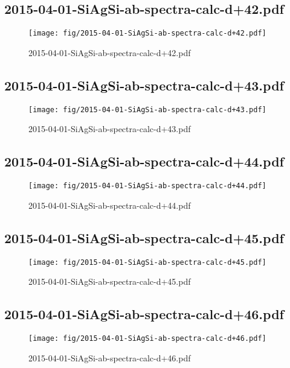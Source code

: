 \documentclass[fullscreen=true]{beamer}
\begin{document}
\subsection{2015-04-01-SiAgSi-ab-spectra-calc-d+42.pdf}
\begin{frame}
  \begin{figure}
    \texttt{[image: fig/2015-04-01-SiAgSi-ab-spectra-calc-d+42.pdf]}%
    \caption{2015-04-01-SiAgSi-ab-spectra-calc-d+42.pdf}
  \end{figure}
\end{frame}

\subsection{2015-04-01-SiAgSi-ab-spectra-calc-d+43.pdf}
\begin{frame}
  \begin{figure}
    \texttt{[image: fig/2015-04-01-SiAgSi-ab-spectra-calc-d+43.pdf]}%
    \caption{2015-04-01-SiAgSi-ab-spectra-calc-d+43.pdf}
  \end{figure}
\end{frame}

\subsection{2015-04-01-SiAgSi-ab-spectra-calc-d+44.pdf}
\begin{frame}
  \begin{figure}
    \texttt{[image: fig/2015-04-01-SiAgSi-ab-spectra-calc-d+44.pdf]}%
    \caption{2015-04-01-SiAgSi-ab-spectra-calc-d+44.pdf}
  \end{figure}
\end{frame}

\subsection{2015-04-01-SiAgSi-ab-spectra-calc-d+45.pdf}
\begin{frame}
  \begin{figure}
    \texttt{[image: fig/2015-04-01-SiAgSi-ab-spectra-calc-d+45.pdf]}%
    \caption{2015-04-01-SiAgSi-ab-spectra-calc-d+45.pdf}
  \end{figure}
\end{frame}

\subsection{2015-04-01-SiAgSi-ab-spectra-calc-d+46.pdf}
\begin{frame}
  \begin{figure}
    \texttt{[image: fig/2015-04-01-SiAgSi-ab-spectra-calc-d+46.pdf]}%
    \caption{2015-04-01-SiAgSi-ab-spectra-calc-d+46.pdf}
  \end{figure}
\end{frame}
\end{document}
